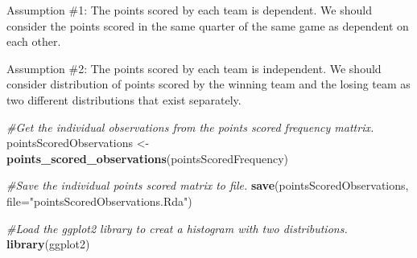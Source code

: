\documentclass[
]{article}
\newenvironment{Shaded}{\begin{snugshade}}{\end{snugshade}}
\newcommand{\CommentTok}[1]{\textcolor[rgb]{0.56,0.35,0.01}{\textit{#1}}}
\newcommand{\DataTypeTok}[1]{\textcolor[rgb]{0.13,0.29,0.53}{#1}}
\newcommand{\KeywordTok}[1]{\textcolor[rgb]{0.13,0.29,0.53}{\textbf{#1}}}
\newcommand{\NormalTok}[1]{#1}
\newcommand{\StringTok}[1]{\textcolor[rgb]{0.31,0.60,0.02}{#1}}
\begin{document}
Assumption \#1: The points scored by each team is dependent. We should
consider the points scored in the same quarter of the same game as
dependent on each other.

Assumption \#2: The points scored by each team is independent. We should
consider distribution of points scored by the winning team and the
losing team as two different distributions that exist separately.

\begin{Shaded}
\begin{Highlighting}[]
\CommentTok{#Get the individual observations from the points scored frequency mattrix.}
\NormalTok{pointsScoredObservations <-}\StringTok{ }\KeywordTok{points_scored_observations}\NormalTok{(pointsScoredFrequency)}

\CommentTok{#Save the individual points scored matrix to file.}
\KeywordTok{save}\NormalTok{(pointsScoredObservations, }\DataTypeTok{file=}\StringTok{"pointsScoredObservations.Rda"}\NormalTok{)}

\CommentTok{#Load the ggplot2 library to creat a histogram with two distributions.}
\KeywordTok{library}\NormalTok{(ggplot2)}


\end{Highlighting}
\end{Shaded}
\end{document}
